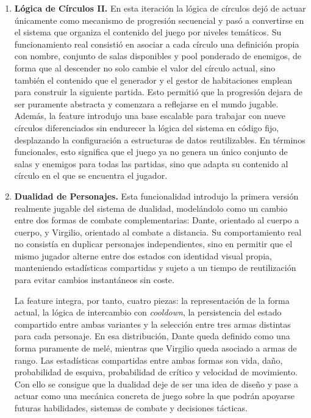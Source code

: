\begin{enumerate}
\item \textbf{Lógica de Círculos II.} En esta iteración la lógica de círculos dejó de actuar
únicamente como mecanismo de progresión secuencial y pasó a convertirse en el sistema que
organiza el contenido del juego por niveles temáticos. Su funcionamiento real consistió en
asociar a cada círculo una definición propia con nombre, conjunto de salas disponibles y
pool ponderado de enemigos, de forma que al descender no solo cambie el valor del círculo
actual, sino también el contenido que el generador y el gestor de habitaciones emplean para
construir la siguiente partida. Esto permitió que la progresión dejara de ser puramente
abstracta y comenzara a reflejarse en el mundo jugable. Además, la feature introdujo una
base escalable para trabajar con nueve círculos diferenciados sin endurecer la lógica del
sistema en código fijo, desplazando la configuración a estructuras de datos reutilizables.
En términos funcionales, esto significa que el juego ya no genera un único conjunto de
salas y enemigos para todas las partidas, sino que adapta su contenido al círculo en el que
se encuentra el jugador.

\item \textbf{Dualidad de Personajes.} Esta funcionalidad introdujo la primera versión
realmente jugable del sistema de dualidad, modelándolo como un cambio entre dos formas de
combate complementarias: Dante, orientado al cuerpo a cuerpo, y Virgilio, orientado al
combate a distancia. Su comportamiento real no consistía en duplicar personajes
independientes, sino en permitir que el mismo jugador alterne entre dos estados con
identidad visual propia, manteniendo estadísticas compartidas y sujeto a un tiempo de
reutilización para evitar cambios instantáneos sin coste.

La feature integra, por tanto, cuatro piezas: la representación de la forma actual, la
lógica de intercambio con \textit{cooldown}, la persistencia del estado compartido entre
ambas variantes y la selección entre tres armas distintas para cada personaje. En esa
distribución, Dante queda definido como una forma puramente de melé, mientras que Virgilio
queda asociado a armas de rango. Las estadísticas compartidas entre ambas formas son vida,
daño, probabilidad de esquiva, probabilidad de crítico y velocidad de movimiento. Con ello
se consigue que la dualidad deje de ser una idea de diseño y pase a actuar como una mecánica
concreta de juego sobre la que podrán apoyarse futuras habilidades, sistemas de combate y
decisiones tácticas.


\end{enumerate}

